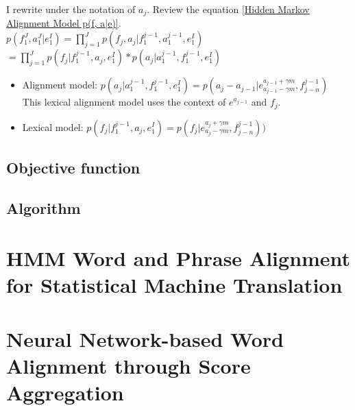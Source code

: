 \documentclass{article}
\begin{document}
I rewrite under the notation of $a_{j}$.
Review the equation \eqref{Hidden Markov Alignment Model p(f, a|e)}. \\
$p(f_1^J, a_1^J|e_1^I) = \prod_{j=1}^J p(f_j, a_j | f_1^{j-1}, a_1^{j-1}, e_1^I)
$\\
$ = \prod_{j=1}^J p( f_j | f_1^{j-1}, a_j, e_1^I) * p( a_j |a_1^{j-1}, f_1^{j-1},  e_1^I)
$

\begin{itemize}
\item Alignment model: $p( a_j |a_1^{j-1}, f_1^{j-1},  e_1^I) = p(a_j - a_{j-1}| e^{a_{j-1} + \gamma m}_{a_{j-1} - \gamma m}, f_{j-n}^{j-1})$ \\
This lexical alignment model uses the context of $e^{a_{j-1}}$ and $f_j$.

\item Lexical model: $p( f_j | f_1^{j-1}, a_j, e_1^I) = p(f_j|e^{a_{j} + \gamma m}_{a_{j} - \gamma m}, f_{j-n}^{j-1})  )$
\end{itemize}

\subsection{Objective function}

\subsection{Algorithm}






\section{HMM Word and Phrase Alignment for Statistical Machine Translation \citep{Deng2008HMM} }


\section{Neural Network-based Word Alignment through Score Aggregation \citep{Legrand16neural}}
\end{document}
